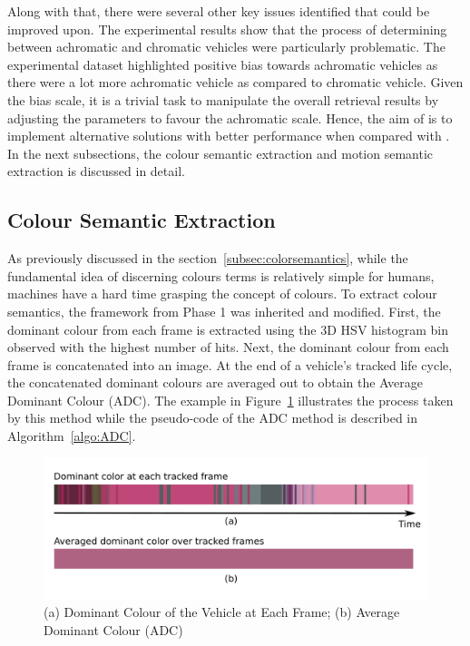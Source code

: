 Along with that, there were several other key issues identified that could be improved upon.
The experimental results show that the process of determining between achromatic and chromatic vehicles were particularly problematic.
The experimental dataset highlighted positive bias towards achromatic vehicles as there were a lot more achromatic vehicle as compared to chromatic vehicle.
Given the bias scale, it is a trivial task to manipulate the overall retrieval results by adjusting the parameters to favour the achromatic scale.
Hence, the aim of \versionTwoExt is to implement alternative solutions with better performance when compared with \versionOneExt. In the next subsections, the colour semantic extraction and motion semantic extraction is discussed in detail.


\subsection{Colour Semantic Extraction}
\label{section:versiontwoColor}
As previously discussed in the section~\ref{subsec:colorsemantics}, while the fundamental idea of discerning colours terms is relatively simple for humans, machines have a hard time grasping the concept of colours. To extract colour semantics, the framework from Phase 1 was inherited and modified.
First, the dominant colour from each frame is extracted using the 3D HSV histogram bin observed with the highest number of hits. Next, the dominant colour from each frame is concatenated into an image. At the end of a vehicle's tracked life cycle, the concatenated dominant colours are averaged out to obtain the Average Dominant Colour (ADC). The example in Figure~\ref{fig:ADC} illustrates the process taken by this method while the pseudo-code of the ADC method is described in Algorithm~\ref{algo:ADC}.

\begin{figure}[hbt!]\centering
\includegraphics[width=.9\textwidth]{image/general/ADC.png}
\caption{(a) Dominant Colour of the Vehicle at Each Frame; (b) Average Dominant Colour (ADC)}
\label{fig:ADC}
\end{figure}

